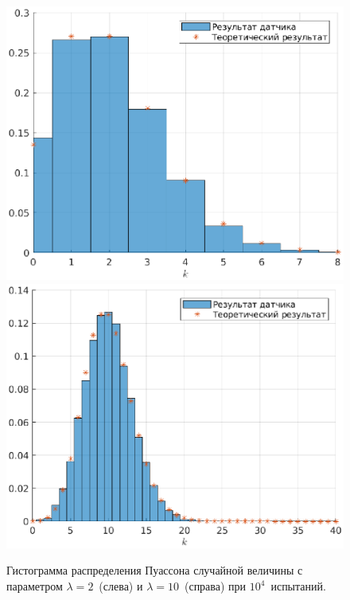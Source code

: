 \begin{figure}[h]
        \includegraphics[width=0.5\linewidth]{task_03/pois2-10000.eps}
        \includegraphics[width=0.5\linewidth]{task_03/pois10-10000.eps}
        \caption{Гистограмма распределения Пуассона случайной величины с параметром $\lambda = 2$~(слева) и $\lambda = 10$~(справа) при $10^4$~испытаний.}
\end{figure}
